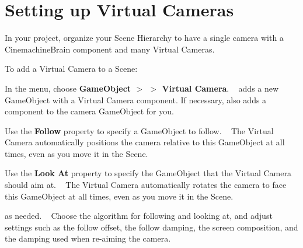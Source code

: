 \chapter{Setting up Virtual Cameras}
\hypertarget{md__hey_tea_9_2_library_2_package_cache_2com_8unity_8cinemachine_0d2_89_87_2_documentation_0i_2_cinemachine_set_up_v_cam}{}\label{md__hey_tea_9_2_library_2_package_cache_2com_8unity_8cinemachine_0d2_89_87_2_documentation_0i_2_cinemachine_set_up_v_cam}
\label{md__hey_tea_9_2_library_2_package_cache_2com_8unity_8cinemachine_0d2_89_87_2_documentation_0i_2_cinemachine_set_up_v_cam_autotoc_md716}%
%
 In your project, organize your Scene Hierarchy to have a single  camera with a Cinemachine\+Brain component and many Virtual Cameras.

To add a Virtual Camera to a Scene\+:


\begin{DoxyEnumerate}
\item In the  menu, choose {\bfseries{Game\+Object \texorpdfstring{$>$}{>}  \texorpdfstring{$>$}{>} Virtual Camera}}. ~\newline
{} adds a new Game\+Object with a  Virtual Camera component. If necessary,  also adds a  component to the  camera Game\+Object for you.
\item Use the {\bfseries{Follow}} property to specify a Game\+Object to follow. ~\newline
The Virtual Camera automatically positions the  camera relative to this Game\+Object at all times, even as you move it in the Scene.
\item Use the {\bfseries{Look At}} property to specify the Game\+Object that the Virtual Camera should aim at. ~\newline
The Virtual Camera automatically rotates the  camera to face this Game\+Object at all times, even as you move it in the Scene.
\item {} as needed. ~\newline
Choose the algorithm for following and looking at, and adjust settings such as the follow offset, the follow damping, the screen composition, and the damping used when re-\/aiming the camera. 
\end{DoxyEnumerate}